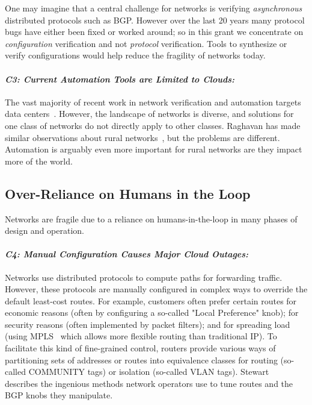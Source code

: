 One may imagine that a central challenge for networks is verifying {\em asynchronous} distributed protocols such as BGP.  However over the last 20 years many protocol bugs have either been fixed or worked around; so in this grant we concentrate on {\em configuration} verification and not {\em protocol} verification.  Tools to synthesize or verify configurations would help reduce the fragility of networks today.

\paragraph*{\em C3: Current Automation Tools are Limited to Clouds:}
%
The vast majority of recent work in network verification and automation targets data centers~\cite{hsa, surgeries, libra, DBLP:conf/popl/FosterKM0T15}. However, the landscape of networks is diverse, and solutions for one class of networks do not directly apply to other classes.   Raghavan has made similar observations about rural networks~\cite{barathwisp}, but the problems are different.  Automation is arguably even more important for rural networks are they impact more of the world.

\subsection{Over-Reliance on Humans in the Loop}
%
Networks are fragile due to a reliance on humans-in-the-loop in many phases of design and operation.

\paragraph*{\em C4: Manual Configuration Causes Major Cloud Outages:}
Networks use distributed protocols to compute paths for forwarding
traffic.  However, these protocols are manually configured in complex
ways to override the default least-cost routes.  For example,
customers often prefer certain routes for economic reasons (often by
configuring a so-called "Local Preference" knob); for security reasons
(often implemented by packet filters); and for spreading load (using  MPLS~\cite{MPLSIna} which allows more flexible routing
than traditional IP). To facilitate this kind of fine-grained control,
routers provide various ways of partitioning sets of addresses or
routes into equivalence classes for routing (so-called COMMUNITY tags)
or isolation (so-called VLAN tags). Stewart~\cite{stewart}
describes the ingenious methods network operators use to tune routes
and the BGP knobs they manipulate.

